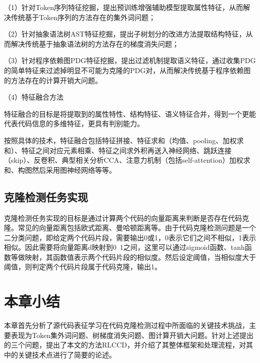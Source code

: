 （1）针对Token序列特征挖掘，提出预训练增强辅助模型提取属性特征，从而解决传统基于Token序列的方法存在的集外词问题；

（2）针对抽象语法树AST特征挖掘，提出子树划分的改进方法提取结构特征，从而解决传统基于抽象语法树的方法存在的梯度消失问题；

（3）针对程序依赖图PDG特征挖掘，提出过滤机制提取语义特征，通过收集PDG的简单特征来过滤掉明显不可能为克隆的PDG对，从而解决传统基于程序依赖图的方法存在的计算开销大问题。

（4）特征融合方法

特征融合的目标是将提取到的属性特性、结构特征、语义特征合并，得到一个更能代表代码信息的多维特征，更具有判别能力。

按照具体的技术，特征融合包括特征拼接、特征求和（均值、pooling、加权求和）、特征之间对应元素相乘、特征之间求外积再送入神经网络、跳跃连接（skip）、反卷积、典型相关分析CCA、注意力机制（包括self-attention）加权求和、构图然后采用图神经网络等等。

\subsection{克隆检测任务实现}
\label{subsec:Clone detection}
克隆检测任务实现的目标是通过计算两个代码的向量距离来判断是否存在代码克隆。常见的向量距离包括欧式距离、曼哈顿距离等。由于代码克隆检测问题是一个二分类问题，即给定两个代码片段，需要输出0或1，0表示它们之间不相似，1表示相似。因此需要将向量距离d映射到0~1之间，这里可以通过sigmoid函数、tanh函数等做映射，其函数值表示两个代码片段的相似度。然后设定阈值，当相似度大于阈值，则判定两个代码片段属于代码克隆，输出1。

\section{本章小结}
\label{sec:Summary2}
本章首先分析了源代码表征学习在代码克隆检测过程中所面临的关键技术挑战，主要表现为Token集外词问题、树梯度消失问题、图计算开销大问题。针对上述提出的三个问题，提出了本文的方法RLCCD，并介绍了其整体框架和处理流程，对其中的关键技术点进行了简要的论述。
